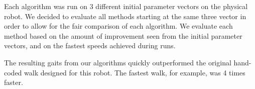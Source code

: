 Each algorithm was run on 3 different initial parameter vectors on the
physical robot. We decided to evaluate all methods starting at the
same three vector in order to allow for the fair comparison of each
algorithm.  We evaluate each method based on the amount of improvement
seen from the initial parameter vectors, and on the fastest speeds
achieved during runs.

The resulting gaits from our algorithms quickly outperformed the original
hand-coded walk designed for this robot. The fastest walk, for example, was
4 times faster.
